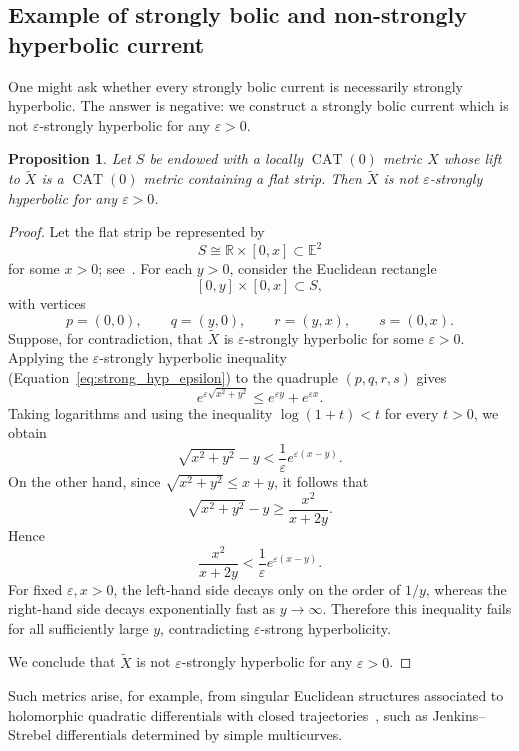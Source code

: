 \documentclass[12pt]{amsart}
\numberwithin{equation}{section}
\numberwithin{figure}{section}
\newtheorem{proposition}[equation]{Proposition}
\theoremstyle{definition}
\theoremstyle{plain}
\DeclareMathOperator{\CAT}{CAT}
\newcommand*{\wt}[1]{\widetilde{#1}}
\renewcommand{\epsilon}{\varepsilon}
\begin{document}
\subsection{Example of strongly bolic and non-strongly hyperbolic current}
\label{subsec:bolic_nonstronglyhyp_CAT}

One might ask whether every strongly bolic current is necessarily strongly hyperbolic. 
The answer is negative: we construct a strongly bolic current which is not $\epsilon$-strongly hyperbolic for any $\epsilon>0$.

\begin{proposition} Let $S$ be endowed with a locally $\CAT(0)$ metric $X$ whose lift to $\widetilde X$ is a $\CAT(0)$ metric containing a flat strip. Then $\wt{X}$ is not $\epsilon$-strongly hyperbolic for any $\epsilon>0$.
\end{proposition}
\begin{proof}
Let the flat strip be represented by
\[
S \cong \mathbb{R}\times [0,x] \subset \mathbb{E}^2
\]
for some $x>0$; see~\cite[Chapter II.2.13]{BH11:NonPosCurvature}. For each $y>0$, consider the Euclidean rectangle
\[
[0,y]\times [0,x]\subset S,
\]
with vertices
\[
p=(0,0), \qquad q=(y,0), \qquad r=(y,x), \qquad s=(0,x).
\]
Suppose, for contradiction, that $\widetilde X$ is $\epsilon$-strongly hyperbolic for some $\epsilon>0$. Applying the $\epsilon$-strongly hyperbolic inequality (Equation~\ref{eq:strong_hyp_epsilon}) to the quadruple $(p,q,r,s)$ gives
\[
e^{\epsilon\sqrt{x^2+y^2}} \leq e^{\epsilon y}+e^{\epsilon x}.
\]
Taking logarithms and using the inequality $\log(1+t)<t$ for every $t>0$, we obtain
\[
\sqrt{x^2+y^2}-y
<
\frac{1}{\epsilon}e^{\epsilon(x-y)}.
\]
On the other hand, since $\sqrt{x^2+y^2}\leq x+y$, it follows that
\[
\sqrt{x^2+y^2}-y
\geq
\frac{x^2}{x+2y}.
\]
Hence
\[
\frac{x^2}{x+2y}
<
\frac{1}{\epsilon}e^{\epsilon(x-y)}.
\]
For fixed $\epsilon,x>0$, the left-hand side decays only on the order of $1/y$, whereas the right-hand side decays exponentially fast as $y\to\infty$. Therefore this inequality fails for all sufficiently large $y$, contradicting $\epsilon$-strong hyperbolicity.

We conclude that $\widetilde X$ is not $\epsilon$-strongly hyperbolic for any $\epsilon>0$.
\end{proof}

Such metrics arise, for example, from singular Euclidean structures associated to holomorphic quadratic differentials with closed trajectories~\cite[Section~5.3]{Hub08:Teich}, such as Jenkins--Strebel differentials determined by simple multicurves.
\end{document}
